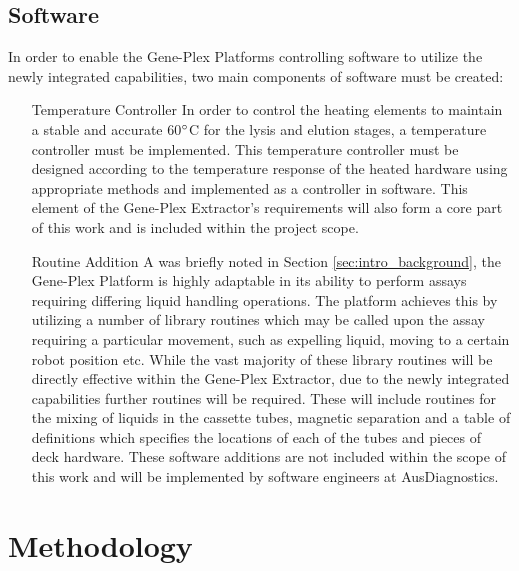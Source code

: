 \subsection{Software}
\label{sec:intro_software}
In order to enable the Gene-Plex Platforms controlling software to utilize the newly integrated capabilities, two main components of software must be created:
\begin{enumerate}
	\item[Temperature Controller] In order to control the heating elements to maintain a stable and accurate 60$\degree$C for the lysis and elution stages, a temperature controller must be implemented. This temperature controller must be designed according to the temperature response of the heated hardware using appropriate methods and implemented as a controller in software. This element of the Gene-Plex Extractor's requirements will also form a core part of this work and is included within the project scope.
	\item [Routine Addition] A was briefly noted in Section \ref{sec:intro_background}, the Gene-Plex Platform is highly adaptable in its ability to perform assays requiring differing liquid handling operations. The platform achieves this by utilizing a number of library routines which may be called upon the assay requiring a particular movement, such as expelling liquid, moving to a certain robot position etc. While the vast majority of these library routines will be directly effective within the Gene-Plex Extractor, due to the newly integrated capabilities further routines will be required. These will include routines for the mixing of liquids in the cassette tubes, magnetic separation and a table of definitions which specifies the locations of each of the tubes and pieces of deck hardware. These software additions are not included within the scope of this work and will be implemented by software engineers at AusDiagnostics.
\end{enumerate}


\section{Methodology}
\label{sec:intro_method}

